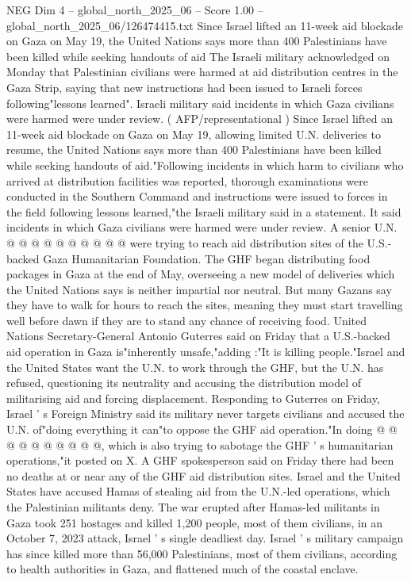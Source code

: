 \begin{textsample}{NEG Dim 4 – global\_north\_2025\_06 – Score 1.00 – global\_north\_2025\_06/126474415.txt}  \label{ex:f4_neg_076}
Since Israel lifted an 11-week aid blockade on Gaza on May 19, the United Nations says more than 400 Palestinians have been killed while seeking handouts of aid The Israeli military acknowledged on Monday that Palestinian civilians were harmed at aid distribution centres in the Gaza Strip, saying that new instructions had been issued to Israeli forces following"lessons learned".
Israeli military said incidents in which Gaza civilians were harmed were under review. ( AFP/representational ) Since Israel lifted an 11-week aid blockade on Gaza on May 19, allowing limited U.N. deliveries to resume, the United Nations says more than 400 Palestinians have been killed while seeking handouts of aid."Following incidents in which harm to civilians who arrived at distribution facilities was reported, thorough examinations were conducted in the Southern Command and instructions were issued to forces in the field following lessons learned,"the Israeli military said in a statement.
It said incidents in which Gaza civilians were harmed were under review.
A senior U.N. @ @ @ @ @ @ @ @ @ @ were trying to reach aid distribution sites of the U.S.-backed Gaza Humanitarian Foundation.
The GHF began distributing food packages in Gaza at the end of May, overseeing a new model of deliveries which the United Nations says is neither impartial nor neutral.
But many Gazans say they have to walk for hours to reach the sites, meaning they must start travelling well before dawn if they are to stand any chance of receiving food.
United Nations Secretary-General Antonio Guterres said on Friday that a U.S.-backed aid operation in Gaza is"inherently unsafe,"adding :"It is killing people."Israel and the United States want the U.N. to work through the GHF, but the U.N. has refused, questioning its neutrality and accusing the distribution model of militarising aid and forcing displacement.
Responding to Guterres on Friday, Israel ' s Foreign Ministry said its military never targets civilians and accused the U.N. of"doing everything it can"to oppose the GHF aid operation."In doing @ @ @ @ @ @ @ @ @ @, which is also trying to sabotage the GHF ' s humanitarian operations,"it posted on X.
A GHF spokesperson said on Friday there had been no deaths at or near any of the GHF aid distribution sites.
Israel and the United States have accused Hamas of stealing aid from the U.N.-led operations, which the Palestinian militants deny.
The war erupted after Hamas-led militants in Gaza took 251 hostages and killed 1,200 people, most of them civilians, in an October 7, 2023 attack, Israel ' s single deadliest day.
Israel ' s military campaign has since killed more than 56,000 Palestinians, most of them civilians, according to health authorities in Gaza, and flattened much of the coastal enclave.

\end{textsample}
